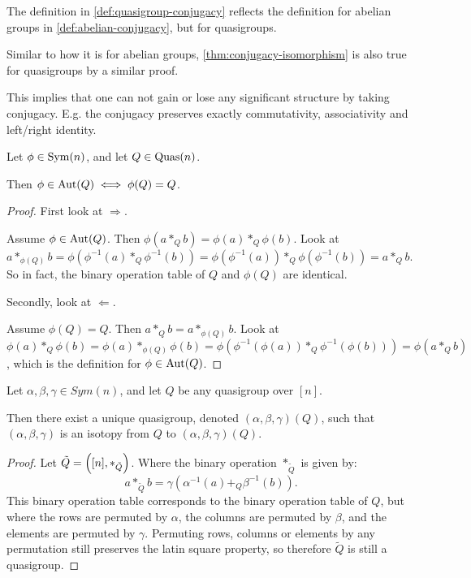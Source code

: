 \begin{remark}
    The definition in \autoref{def:quasigroup-conjugacy} reflects the definition for abelian groups in \autoref{def:abelian-conjugacy}, but for quasigroups.
\end{remark}

\begin{remark}
    Similar to how it is for abelian groups, \autoref{thm:conjugacy-isomorphism} is also true for quasigroups by a similar proof.

    This implies that one can not gain or lose any significant structure by taking conjugacy. E.g. the conjugacy preserves exactly commutativity, associativity and left/right identity.
\end{remark}

\begin{theorem} \label{thm:quasi-automorphism-iff-self-conjugate}
    Let \( \phi \in \operatorname{Sym}(n) \), and let \( Q \in \operatorname{Quas}(n) \).

    Then \( \phi \in \operatorname{Aut}(Q) \iff \phi(Q) = Q \).
\end{theorem}
\begin{proof}
    First look at \( \Rightarrow \).

    Assume \( \phi \in \operatorname{Aut}(Q) \). Then \( \phi(a *_Q b) = \phi(a) *_Q \phi(b) \). Look at \( a *_{\phi(Q)} b = \phi(\phi^{-1}(a) *_Q \phi^{-1}(b)) = \phi(\phi^{-1}(a)) *_Q \phi(\phi^{-1}(b)) = a *_Q b \). So in fact, the binary operation table of \( Q \) and \( \phi(Q) \) are identical.

    Secondly, look at \( \Leftarrow \).

    Assume \( \phi(Q) = Q \). Then \( a *_Q b = a *_{\phi(Q)} b \). Look at \( \phi(a) *_Q \phi(b) = \phi(a) *_{\phi(Q)} \phi(b) = \phi(\phi^{-1}(\phi(a)) *_Q \phi^{-1}(\phi(b))) = \phi(a *_Q b) \), which is the definition for \( \phi \in \operatorname{Aut}(Q) \). 
\end{proof}

\begin{lemma} \label{lemma:isotopy-image}
    Let \( \alpha, \beta, \gamma \in Sym(n) \), and let \( Q \) be any quasigroup over \( [n] \).

    Then there exist a unique quasigroup, denoted \( (\alpha, \beta, \gamma)(Q) \), such that \( (\alpha, \beta, \gamma) \) is an isotopy from \( Q \) to \( (\alpha, \beta, \gamma)(Q) \).
\end{lemma}
\begin{proof}
    Let \( \tilde{Q} = \left( [n], *_{\tilde{Q}} \right) \). Where the binary operation \( *_{\tilde{Q}} \) is given by:
    \[
        a *_{\tilde{Q}} b = \gamma(\alpha^{-1}(a) +_Q \beta^{-1}(b)).
    \]
    This binary operation table corresponds to the binary operation table of \( Q \), but where the rows are permuted by \( \alpha \), the columns are permuted by \( \beta \), and the elements are permuted by \( \gamma \). Permuting rows, columns or elements by any permutation still preserves the latin square property, so therefore \( \tilde{Q} \) is still a quasigroup.
\end{proof}

